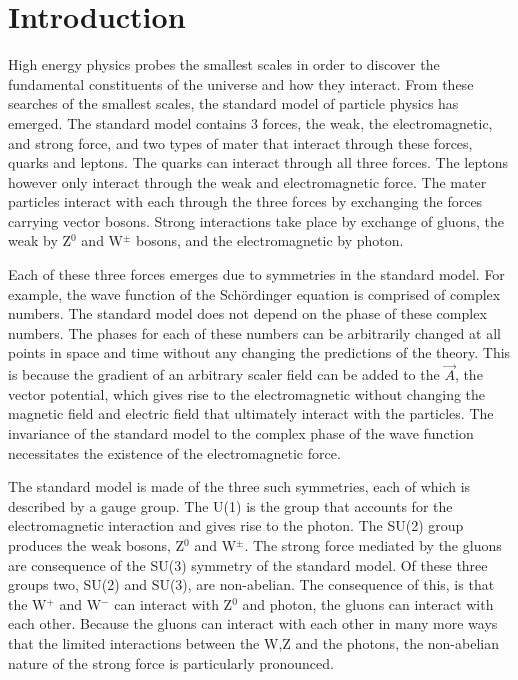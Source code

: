 \chapter{Introduction}
  High energy physics probes the smallest scales in order to discover the 
    fundamental constituents of the universe and how they interact.
  From these searches of the smallest scales, the standard model of particle
    physics has emerged. 
  The standard model contains 3 forces, the weak, the electromagnetic, and 
    strong force, and two types of mater that interact through these forces,
    quarks and leptons.
  The quarks can interact through all three forces.
  The leptons however only interact through the weak and electromagnetic force.
  The mater particles interact with each through the three forces by exchanging the
    forces carrying vector bosons. 
  Strong interactions take place by exchange of gluons, the weak by Z$^{0}$ and
    W$^{\pm}$ bosons, and the electromagnetic by photon. 
  
  Each of these three forces emerges due to symmetries in the standard model.
  For example, the wave function of the Sch\"{o}rdinger equation is comprised
    of complex numbers.
  The standard model does not depend on the phase of these complex numbers. 
  The phases for each of these numbers can be arbitrarily changed at all points
    in space and time without any changing the predictions of the theory.
  This is because the gradient of an arbitrary scaler field can be added to the
    $\vec{A}$, the vector potential, which gives rise to the electromagnetic 
    without changing the magnetic field and electric field that ultimately
    interact with the particles. 
  The invariance of the standard model to the complex phase of the wave 
    function necessitates the existence of the electromagnetic force. 

  The standard model is made of the three such symmetries, each of which is
    described by a gauge group. 
  The U(1) is the group that accounts for the electromagnetic interaction
    and gives rise to the photon. 
  The SU(2) group produces the weak bosons, Z$^{0}$ and W$^{\pm}$.
  The strong force mediated by the gluons are consequence of the SU(3) symmetry
    of the standard model.
  Of these three groups two, SU(2) and SU(3), are non-abelian. 
  The consequence of this, is that the W$^{+}$ and W$^{-}$ can interact with 
    Z$^{0}$ and photon, the gluons can interact with each other. 
  Because the gluons can interact with each other in many more ways that the 
    limited interactions between the W,Z and the photons, the non-abelian 
    nature of the strong force is particularly pronounced. 

